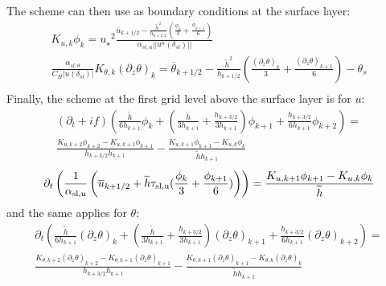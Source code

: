 The scheme can then use as boundary conditions at the surface layer:
\begin{equation}
\label{eq:ND_StratifiedCase_boundaryConditionFVfree}
\begin{aligned}
	K_{u,k} \phi_k = {u_\star}^2
  \frac{\overline{u}_{k+1/2} - \frac{\widetilde{h}^2}{h_{k+1/2}}
	(\frac{\phi_k}{3} + \frac{\phi_{k+1}}{6})}
	{\alpha_{sl, u}||u^n(\delta_{sl})||} \\
  \frac{\alpha_{sl, \theta} }
  {C_H |u(\delta_{sl})|}
	K_{\theta, k} (\partial_z \theta)_k = 
  \overline{\theta}_{k+1/2} - \frac{\widetilde{h}^2}{h_{k+1/2}}
	(\frac{{(\partial_z \theta)}_k}{3} +
	\frac{{(\partial_z \theta)}_{k+1}}{6}) 
  - \theta_s\\
\end{aligned}
\end{equation}
Finally, the scheme at the first grid level above
the surface layer is for $u$:
\begin{equation}
\label{eq:ND_StratifiedCase_prognosticu_FVfree}
    \begin{aligned}
(\partial_t + if)
	    \left(\frac{\widetilde{h}}{6h_{k+1}} 
    \phi_k
    +
    \left(
	    \frac{\widetilde{h}}{3h_{k+1}} 
	    + \frac{h_{k+3/2}}{3h_{k+1}}
    \right)
	    \phi_{k+1}
	    + \frac{h_{k+3/2}}{6h_{k+1}} \phi_{k+2}\right)
    = \\
	    \frac{K_{u, k+2} \phi_{k+2} - K_{u, k+1} \phi_{k+1}}
	    {h_{k+3/2}h_{k+1}} - \frac{K_{u, k+1} \phi_{k+1} -
	    K_{u,k} \phi_k }{\widetilde{h}h_{k+1}}
    \end{aligned}
\end{equation}
\begin{equation}
	\label{eq:ND_StratifiedCase_semiDiscreteEkmanEqFVfree}
	\partial_t \left(\frac{1}{\alpha_{\rm sl, u}}
	\left(\overline{u}_{k+1/2} + \widetilde{h}\tau_{\rm sl, u}
	(\frac{\phi_k}{3} + \frac{\phi_{k+1}}{6})\right)\right)
	= \frac{K_{u, k+1}\phi_{k+1} - K_{u,k} \phi_k}{\widetilde{h}}
\end{equation}
and the same applies for $\theta$:
\begin{equation}
\label{eq:ND_StratifiedCase_prognosticPT_FVfree}
    \begin{aligned}
\partial_t \left(\frac{\widetilde{h}}{6h_{k+1}} 
	    {(\partial_z \theta)}_k
    +
    \left(
	    \frac{\widetilde{h}}{3h_{k+1}} 
	    + \frac{h_{k+3/2}}{3h_{k+1}}
    \right)
	    {(\partial_z \theta)}_{k+1}
	    + \frac{h_{k+3/2}}{6h_{k+1}} {(\partial_z \theta)}_{k+2}\right)
    = \\
	    \frac{K_{\theta, k+2} {(\partial_z \theta)}_{k+2} -
	    K_{\theta, k+1} {(\partial_z \theta)}_{k+1}}
	    {h_{k+3/2}h_{k+1}} - \frac{K_{\theta, k+1} {(\partial_z \theta)}_{k+1} -
	    K_{\theta, k} {(\partial_z \theta)}_k }{\widetilde{h}h_{k+1}}
    \end{aligned}
\end{equation}
